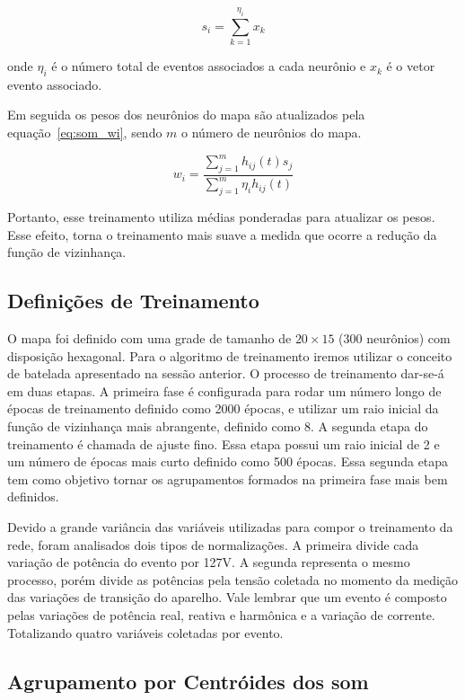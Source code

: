 \begin{equation}\label{eq:sum_centroide}
s_{i}=\sum_{k=1}^{\eta_{i}}x_{k}
\end{equation}

\noindent onde $\eta_{i}$ é o número total de eventos associados a
cada neurônio e $x_{k}$ é o vetor evento associado. 

Em seguida os pesos dos neurônios do mapa são atualizados pela
equação~\ref{eq:som_wi}, sendo $m$ o número de neurônios do mapa.

\begin{equation}
\label{eq:som_wi}
w_{i} = \frac{\sum_{j=1}^{m}h_{ij}(t)s_{j}}{\sum_{j=1}^{m}\eta_{i}h_{ij}(t)} 
\end{equation}

Portanto, esse treinamento utiliza médias ponderadas para atualizar os
pesos. Esse efeito, torna o treinamento mais suave a medida que ocorre
a redução da função de vizinhança. 

\subsection{Definições de Treinamento}
\label{sec:som_treinamento}

O mapa foi definido com uma grade de tamanho de $20 \times 15$ (300
neurônios) com disposição hexagonal. Para o algoritmo de treinamento
iremos utilizar o conceito de batelada apresentado na sessão anterior.
O processo de treinamento dar-se-á em duas etapas. A primeira fase é
configurada para rodar um número longo de épocas de treinamento
definido como 2000 épocas, e utilizar um raio inicial da função de
vizinhança mais abrangente, definido como 8. A segunda etapa do
treinamento é chamada de ajuste fino. Essa etapa possui um raio
inicial de 2 e um número de épocas mais curto definido como 500
épocas. Essa segunda etapa tem como objetivo tornar os agrupamentos
formados na primeira fase mais bem definidos.

Devido a grande variância das variáveis utilizadas para compor o
treinamento da rede, foram analisados dois tipos de normalizações. A
primeira divide cada variação de potência do evento por 127V. A
segunda representa o mesmo processo, porém divide as potências pela
tensão coletada no momento da medição das variações de transição do
aparelho. Vale lembrar que um evento é composto pelas variações de
potência real, reativa e harmônica e a variação de corrente.
Totalizando quatro variáveis coletadas por evento.

\subsection{Agrupamento por Centróides dos \acl{som}}

